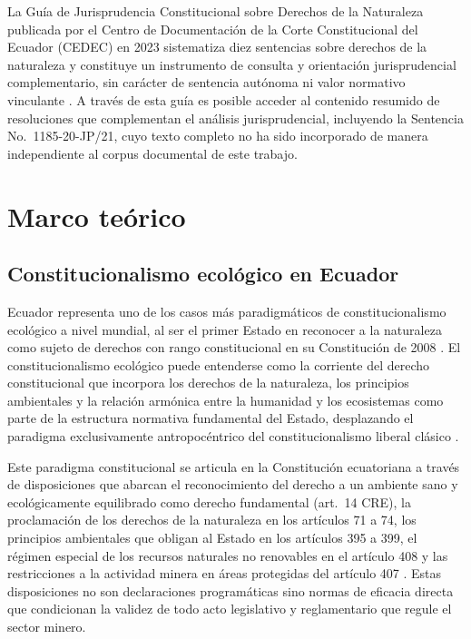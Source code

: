 La Guía de Jurisprudencia Constitucional sobre Derechos de la Naturaleza publicada por el Centro de Documentación de la Corte Constitucional del Ecuador (CEDEC) en 2023 sistematiza diez sentencias sobre derechos de la naturaleza y constituye un instrumento de consulta y orientación jurisprudencial complementario, sin carácter de sentencia autónoma ni valor normativo vinculante \parencite{cedec_guia_2023}. A través de esta guía es posible acceder al contenido resumido de resoluciones que complementan el análisis jurisprudencial, incluyendo la Sentencia No.\ 1185-20-JP/21, cuyo texto completo no ha sido incorporado de manera independiente al corpus documental de este trabajo.

\section{Marco teórico}

\subsection{Constitucionalismo ecológico en Ecuador}

Ecuador representa uno de los casos más paradigmáticos de constitucionalismo ecológico a nivel mundial, al ser el primer Estado en reconocer a la naturaleza como sujeto de derechos con rango constitucional en su Constitución de 2008 \parencite{cre_2008}. El constitucionalismo ecológico puede entenderse como la corriente del derecho constitucional que incorpora los derechos de la naturaleza, los principios ambientales y la relación armónica entre la humanidad y los ecosistemas como parte de la estructura normativa fundamental del Estado, desplazando el paradigma exclusivamente antropocéntrico del constitucionalismo liberal clásico \parencite{grefa_valencia_2021,lozano_espinosa_2023}.

Este paradigma constitucional se articula en la Constitución ecuatoriana a través de disposiciones que abarcan el reconocimiento del derecho a un ambiente sano y ecológicamente equilibrado como derecho fundamental (art.\ 14 CRE), la proclamación de los derechos de la naturaleza en los artículos 71 a 74, los principios ambientales que obligan al Estado en los artículos 395 a 399, el régimen especial de los recursos naturales no renovables en el artículo 408 y las restricciones a la actividad minera en áreas protegidas del artículo 407 \parencite{cre_2008}. Estas disposiciones no son declaraciones programáticas sino normas de eficacia directa que condicionan la validez de todo acto legislativo y reglamentario que regule el sector minero.

